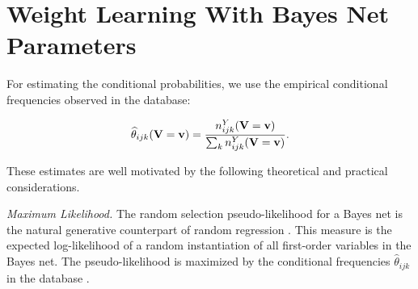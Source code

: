 \documentclass[twoside,leqno,twocolumn]{article}
\begin{document}
%




\section{Weight Learning With Bayes Net Parameters}

For estimating the conditional probabilities, we use the empirical conditional frequencies observed in the database:

\begin{equation*} \label{eq:frequencies}
\widehat{\theta}_{ijk}(\mathbf{V} = \mathbf{v}) = \frac{n^{Y}_{ijk}(\mathbf{V} = \mathbf{v})}{\sum_{k}n^{Y}_{ijk}(\mathbf{V} = \mathbf{v})}.
\end{equation*}

These estimates are well motivated by the following theoretical and practical considerations. 

\emph{Maximum Likelihood.} The  random selection pseudo-likelihood for a Bayes net is the natural generative counterpart of random regression \cite{Schulte2011}. This measure is the expected log-likelihood of a random instantiation of all first-order variables in the Bayes net. The pseudo-likelihood is maximized by the conditional frequencies $\widehat{\theta}_{ijk}$ in the database \cite[Prop.3.1]{Schulte2011}. 
\end{document}
